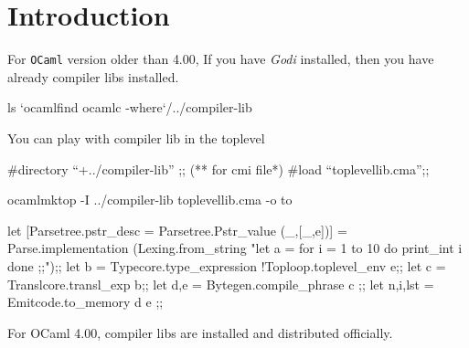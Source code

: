 \section{Introduction}


For \verb|OCaml| version older than 4.00, If you have \textit{Godi}
installed, then you have already compiler libs installed.

\begin{bashcode}
ls `ocamlfind ocamlc -where`/../compiler-lib  
\end{bashcode}

You can play with compiler lib in the toplevel

\begin{ocamlcode}
  #directory ``+../compiler-lib'' ;; (** for cmi file*)
  #load ``toplevellib.cma'';;
\end{ocamlcode}

\begin{bashcode}
  ocamlmktop -I ../compiler-lib toplevellib.cma -o to
\end{bashcode}

\begin{ocamlcode}
let
[{Parsetree.pstr_desc = Parsetree.Pstr_value (_,[_,e])}]
= Parse.implementation
    (Lexing.from_string
       "let a = for i = 1 to 10 do print_int i done ;;");;
let b = Typecore.type_expression !Toploop.toplevel_env e;;
let c = Translcore.transl_exp b;;
let d,e = Bytegen.compile_phrase c ;;
let n,i,lst = Emitcode.to_memory d e ;;
\end{ocamlcode}


For OCaml 4.00, compiler libs are installed and distributed officially.


